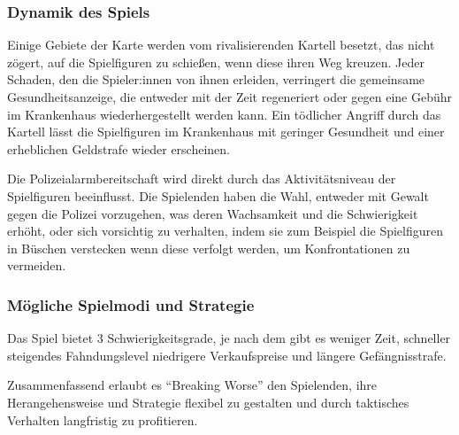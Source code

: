 \subsubsection{Dynamik des Spiels}

Einige Gebiete der Karte werden vom rivalisierenden Kartell besetzt, das nicht zögert, 
auf die Spielfiguren zu schießen, wenn diese ihren Weg kreuzen. 
Jeder Schaden, den die Spieler:innen von ihnen erleiden, 
verringert die gemeinsame Gesundheitsanzeige, 
die entweder mit der Zeit regeneriert oder gegen eine Gebühr im Krankenhaus wiederhergestellt werden kann.
 Ein tödlicher Angriff durch das Kartell lässt die Spielfiguren im Krankenhaus mit geringer Gesundheit und einer erheblichen Geldstrafe wieder erscheinen.

Die Polizeialarmbereitschaft wird direkt durch das Aktivitätsniveau der Spielfiguren beeinflusst.
Die Spielenden haben die Wahl, entweder mit Gewalt gegen die Polizei vorzugehen,
was deren Wachsamkeit und die Schwierigkeit erhöht,
oder sich vorsichtig zu verhalten,
indem sie zum Beispiel die Spielfiguren in Büschen verstecken wenn diese verfolgt werden,
um Konfrontationen zu vermeiden.

\subsubsection{Mögliche Spielmodi und Strategie}

Das Spiel bietet 3 Schwierigkeitsgrade, je nach dem gibt es weniger Zeit, schneller steigendes Fahndungslevel niedrigere Verkaufspreise und längere Gefängnisstrafe.

Zusammenfassend erlaubt es "`Breaking Worse"' den Spielenden, ihre Herangehensweise und Strategie 
flexibel zu gestalten und durch taktisches Verhalten langfristig zu profitieren.


